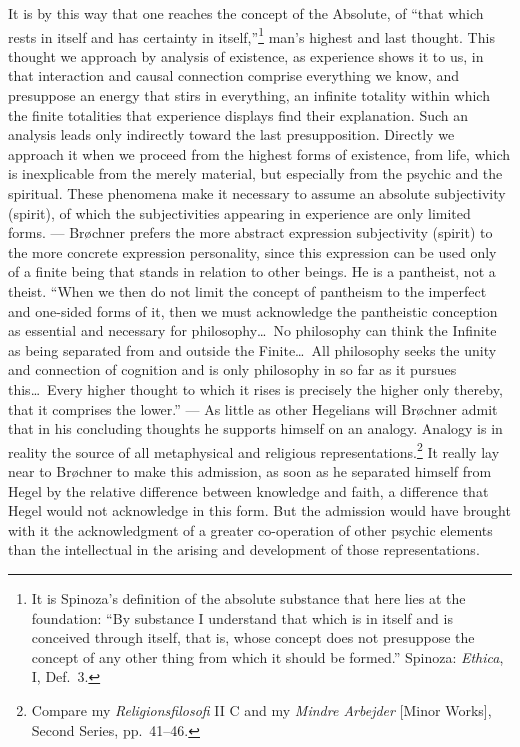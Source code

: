 \documentclass[12pt,a4paper]{book}
\newcommand{\opage}[1]{\marginnote{\footnotesize\textit{[#1]}}}
\begin{document}
It is by this way that one reaches the concept of the Absolute, of ``that which rests in itself
and has certainty in itself,''\footnote{It is Spinoza's definition of the absolute substance that
here lies at the foundation: ``By substance I understand that which is in itself and is conceived
through itself, that is, whose concept does not presuppose the concept of any other thing from
which it should be formed.'' Spinoza: \emph{Ethica}, I, Def.~3.} man's highest and last thought.
This thought we approach by analysis of existence, as experience shows it to us, in that
interaction and causal connection comprise everything we know, and presuppose an energy that stirs
in everything, an infinite totality within which the finite totalities that experience displays
find their explanation. Such an analysis leads only indirectly toward the last presupposition.
Directly we approach it when we proceed from the highest forms of existence, from life, which is
inexplicable from the merely material, but especially from the psychic \opage{204}and the spiritual. These
phenomena make it necessary to assume an absolute subjectivity (spirit), of which the
subjectivities appearing in experience are only limited forms. --- Brøchner prefers the more
abstract expression subjectivity (spirit) to the more concrete expression personality, since this
expression can be used only of a finite being that stands in relation to other beings. He is a
pantheist, not a theist. ``When we then do not limit the concept of pantheism to the imperfect
and one-sided forms of it, then we must acknowledge the pantheistic conception as essential and
necessary for philosophy\ldots\ No philosophy can think the Infinite as being separated from and
outside the Finite\ldots\ All philosophy seeks the unity and connection of cognition and is only
philosophy in so far as it pursues this\ldots\ Every higher thought to which it rises is precisely
the higher only thereby, that it comprises the lower.'' --- As little as other Hegelians will
Brøchner admit that in his concluding thoughts he supports himself on an analogy. Analogy is in
reality the source of all metaphysical and religious representations.\footnote{Compare my
\emph{Religionsfilosofi} II C and my \emph{Mindre Arbejder} [Minor Works], Second Series,
pp.~41--46.} It really lay near to Brøchner to make this admission, as soon as he separated
himself from Hegel by the relative difference between knowledge and faith, a difference that Hegel
would not acknowledge in this form. But the admission would have brought with it the acknowledgment
of a greater co-operation of other psychic elements than the intellectual in the arising and
development of those representations.
\end{document}
